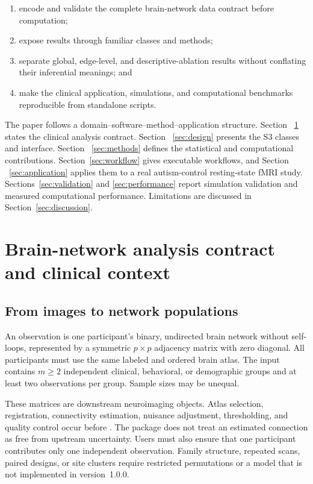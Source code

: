 \documentclass[article]{jss}\usepackage[]{graphicx}\usepackage[]{xcolor}
\begin{document}
\begin{enumerate}
  \item encode and validate the complete brain-network data contract before
    computation;
  \item expose results through familiar  classes and methods;
  \item separate global, edge-level, and descriptive-ablation results without
    conflating their inferential meanings; and
  \item make the clinical application, simulations, and computational
    benchmarks reproducible from standalone scripts.
\end{enumerate}

The paper follows a domain--software--method--application structure. Section
~\ref{sec:contract} states the clinical analysis contract. Section
~\ref{sec:design} presents the S3 classes and interface. Section
~\ref{sec:methods} defines the statistical and computational contributions.
Section~\ref{sec:workflow} gives executable workflows, and Section
~\ref{sec:application} applies them to a real autism-control resting-state
fMRI study. Sections~\ref{sec:validation} and \ref{sec:performance} report
simulation validation and measured computational performance. Limitations are
discussed in Section~\ref{sec:discussion}.

\section{Brain-network analysis contract and clinical context}
\label{sec:contract}

\subsection{From images to network populations}

An observation is one participant's binary, undirected brain network without
self-loops, represented by a symmetric $p\times p$ adjacency matrix with zero
diagonal. All participants must use the same labeled and ordered brain atlas.
The input contains $m\geq2$ independent clinical, behavioral, or demographic
groups and at least two observations per group. Sample sizes may be unequal.

These matrices are downstream neuroimaging objects. Atlas selection,
registration, connectivity estimation, nuisance adjustment, thresholding, and
quality control occur before . The package does not treat an
estimated connection as free from upstream uncertainty. Users must also ensure
that one participant contributes only one independent observation. Family
structure, repeated scans, paired designs, or site clusters require restricted
permutations or a model that is not implemented in version~1.0.0.
\end{document}

